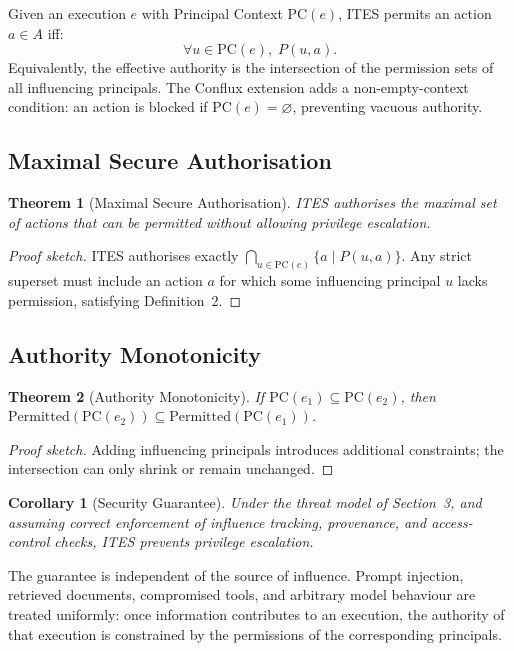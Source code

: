 \documentclass{article}
\newtheorem{theorem}{Theorem}
\newtheorem{corollary}{Corollary}
\begin{document}
Given an execution $e$ with Principal Context $\mathrm{PC}(e)$, ITES permits
an action $a \in A$ iff:
\[
\forall u \in \mathrm{PC}(e),\; P(u, a).
\]
Equivalently, the effective authority is the intersection of the permission
sets of all influencing principals. The Conflux extension adds a
non-empty-context condition: an action is blocked if $\mathrm{PC}(e) =
\varnothing$, preventing vacuous authority.

\subsection{Maximal Secure Authorisation}

\begin{theorem}[Maximal Secure Authorisation]
ITES authorises the maximal set of actions that can be permitted without
allowing privilege escalation.
\end{theorem}

\begin{proof}[Proof sketch]
ITES authorises exactly $\bigcap_{u \in \mathrm{PC}(e)} \{a \mid P(u, a)\}$.
Any strict superset must include an action $a$ for which some influencing
principal $u$ lacks permission, satisfying Definition~2.
\end{proof}

\subsection{Authority Monotonicity}

\begin{theorem}[Authority Monotonicity]
If $\mathrm{PC}(e_1) \subseteq \mathrm{PC}(e_2)$, then
$\mathrm{Permitted}(\mathrm{PC}(e_2)) \subseteq
\mathrm{Permitted}(\mathrm{PC}(e_1))$.
\end{theorem}

\begin{proof}[Proof sketch]
Adding influencing principals introduces additional constraints; the
intersection can only shrink or remain unchanged.
\end{proof}

\begin{corollary}[Security Guarantee]
Under the threat model of Section~3, and assuming correct enforcement of
influence tracking, provenance, and access-control checks, ITES prevents
privilege escalation.
\end{corollary}

The guarantee is independent of the source of influence. Prompt injection,
retrieved documents, compromised tools, and arbitrary model behaviour are
treated uniformly: once information contributes to an execution, the
authority of that execution is constrained by the permissions of the
corresponding principals.
\end{document}

